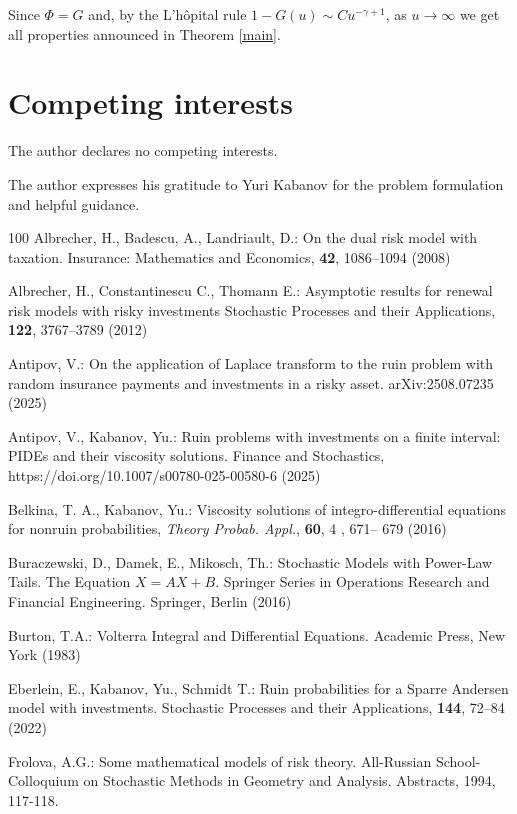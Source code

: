 Since $\Phi=G$ and, by the L'h\^opital rule $1-G(u)\sim Cu^{-\gamma + 1}$, as $u\to \infty$ we get all properties announced in Theorem \ref{main}.

\section*{Competing interests}
The author declares no competing interests.

\acknowledgement 
The author expresses his gratitude to Yuri Kabanov for the problem formulation and helpful guidance. 

\begin{thebibliography}{100} 
Albrecher, H., Badescu, A., Landriault, D.: On the dual risk model with taxation.
Insurance: Mathematics and Economics, {\bf 42}, 1086--1094 (2008)

Albrecher, H., Constantinescu C., Thomann E.: 
Asymptotic results for renewal risk models with risky investments
Stochastic Processes and their Applications,
{\bf 122}, 3767--3789 (2012)

Antipov, V.: On the application of Laplace transform to the ruin problem with random insurance payments and investments in a risky asset. arXiv:2508.07235 (2025)

Antipov, V., Kabanov, Yu.: Ruin problems with investments on a finite interval: PIDEs and their viscosity solutions.
Finance and Stochastics, 
https://doi.org/10.1007/s00780-025-00580-6 (2025)

Belkina, T. A., Kabanov, Yu.: Viscosity solutions of integro-differential equations for nonruin probabilities, {\em Theory Probab. Appl.}, {\bf 60}, 4 , 671-- 679 (2016)

Buraczewski, D., Damek, E., Mikosch, Th.:
Stochastic Models with Power-Law Tails. The Equation $X = AX + B$.
Springer Series in Operations Research and Financial Engineering. Springer, Berlin (2016)

Burton, T.A.:
Volterra Integral and Differential Equations.
Academic Press, New York (1983)

Eberlein, E., Kabanov, Yu., Schmidt T.: 
Ruin probabilities for a Sparre Andersen model with investments. 
Stochastic Processes and their Applications,
{\bf 144}, 
72--84 (2022)

 Frolova, A.G.: Some mathematical models of risk theory. All-Russian School-Colloquium on Stochastic Methods in Geometry and Analysis. Abstracts, 1994, 117-118.


\end{thebibliography}
